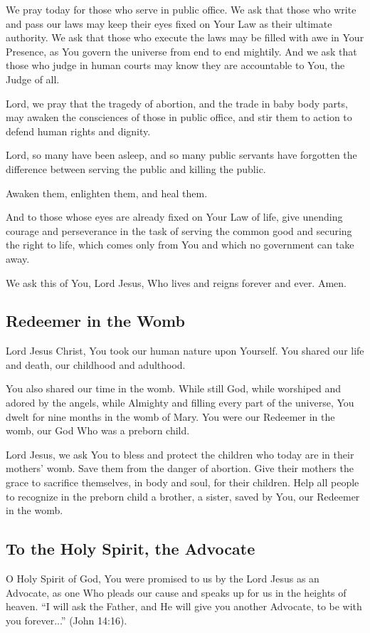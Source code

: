 \documentclass[12pt]{article}
\newcommand{\prayertitle}[1]{\subsection{#1}}
\begin{document}
We pray today for those who serve in public office.
We ask that those who write and pass our laws may keep their eyes fixed on Your Law as their ultimate authority.
We ask that those who execute the laws may be filled with awe in Your Presence, as You govern the universe from end to end mightily.
And we ask that those who judge in human courts may know they are accountable to You, the Judge of all.

Lord, we pray that the tragedy of abortion, and the trade in baby body parts, may awaken the consciences of those in public office, and stir them to action to defend human rights and dignity.

Lord, so many have been asleep, and so many public servants have forgotten the difference between serving the public and killing the public.

Awaken them, enlighten them, and heal them.

And to those whose eyes are already fixed on Your Law of life, give unending courage and perseverance in the task of serving the common good and securing the right to life, which comes only from You and which no government can take away.

We ask this of You, Lord Jesus, Who lives and reigns forever and ever. Amen.

\prayertitle{Redeemer in the Womb}
Lord Jesus Christ, You took our human nature upon Yourself.
You shared our life and death, our childhood and adulthood.

You also shared our time in the womb. While still God, while worshiped and adored by the angels, while Almighty and filling every part of the universe, You dwelt for nine months in the womb of Mary.
You were our Redeemer in the womb, our God Who was a preborn child.

Lord Jesus, we ask You to bless and protect the children who today are in their mothers' womb.
Save them from the danger of abortion.
Give their mothers the grace to sacrifice themselves, in body and soul, for their children.
Help all people to recognize in the preborn child a brother, a sister, saved by You, our Redeemer in the womb.

\prayertitle{To the Holy Spirit, the Advocate}
O Holy Spirit of God, You were promised to us by the Lord Jesus as an Advocate, as one Who pleads our cause and speaks up for us in the heights of heaven.
``I will ask the Father, and He will give you another Advocate, to be with you forever...'' (John 14:16).
\end{document}
